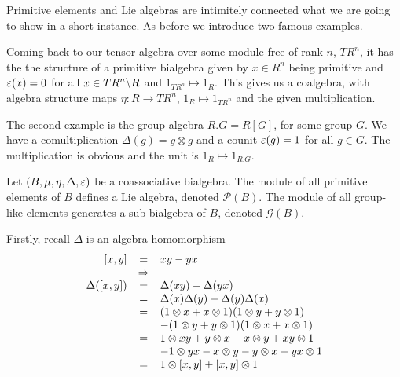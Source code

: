 \bmk Primitive elements and Lie algebras are intimitely connected what we are going to show in a short instance.
\bsp As before we introduce two famous examples.
\bn
\item Coming back to our tensor algebra over some module free of rank $n$, $T R^n$, it has the the structure of a primitive bialgebra given by $x \in R^n$ being primitive and $\eps(x) = 0$ for all $x \in T R^n\bsl R$ and $1_{TR^n} \longmapsto 1_R$. This gives us a coalgebra, with algebra structure maps $\eta : R \longrightarrow TR^n$, $1_R \longmapsto 1_{TR^n}$ and the given multiplication.
\item The second example is the group algebra $R.G = R[G]$, for some group $G$. We have a comultiplication $\Delta(g) = g \otimes g$ and a counit $\eps(g) = 1$ for all $g \in G$. The multiplication is obvious and the unit is $1_R \longmapsto 1_{R.G}$.
\en
\begin{prop}\label{prop08}
Let $(B,\mu,\eta,\Delta,\eps)$ be a coassociative bialgebra. The module of all primitive elements of $B$ defines a Lie algebra, denoted $\mathcal{P}(B)$. The module of all group-like elements generates a sub bialgebra of $B$, denoted $\mathcal{G}(B)$.
\end{prop}
\bws Firstly, recall $\Delta$ is an algebra homomorphism
$$\bao{rcl}
[x,y] &=& x y - y x\\
 &\RA&\\
 \Delta([x,y]) &=& \Delta(x y) - \Delta(y x)\\ &=& \Delta(x) \Delta(y) - \Delta(y) \Delta(x)\\
&=&(1 \otimes x + x \otimes 1)(1 \otimes y + y \otimes 1) \\
&& - (1 \otimes y + y \otimes 1)(1 \otimes x + x \otimes 1)\\
 &=& 1 \otimes x y + y \otimes x + x \otimes y + x y \otimes 1\\
&& - 1 \otimes y x - x \otimes y - y \otimes x - y x \otimes 1\\
&=& 1 \otimes [x,y] + [x,y] \otimes 1\\
\ea$$
